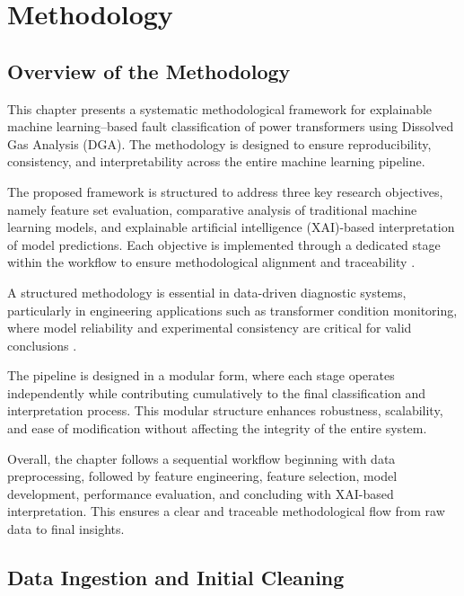 \chapter{Methodology}
\label{chap:methodology}

\section{Overview of the Methodology}

This chapter presents a systematic methodological framework for explainable machine learning–based fault classification of power transformers using Dissolved Gas Analysis (DGA). The methodology is designed to ensure reproducibility, consistency, and interpretability across the entire machine learning pipeline.

The proposed framework is structured to address three key research objectives, namely feature set evaluation, comparative analysis of traditional machine learning models, and explainable artificial intelligence (XAI)-based interpretation of model predictions. Each objective is implemented through a dedicated stage within the workflow to ensure methodological alignment and traceability \parencite{Dladla2025SLR}.

A structured methodology is essential in data-driven diagnostic systems, particularly in engineering applications such as transformer condition monitoring, where model reliability and experimental consistency are critical for valid conclusions \parencite{Cao2024Advancement}.

The pipeline is designed in a modular form, where each stage operates independently while contributing cumulatively to the final classification and interpretation process. This modular structure enhances robustness, scalability, and ease of modification without affecting the integrity of the entire system.

Overall, the chapter follows a sequential workflow beginning with data preprocessing, followed by feature engineering, feature selection, model development, performance evaluation, and concluding with XAI-based interpretation. This ensures a clear and traceable methodological flow from raw data to final insights.

\section{Data Ingestion and Initial Cleaning}

